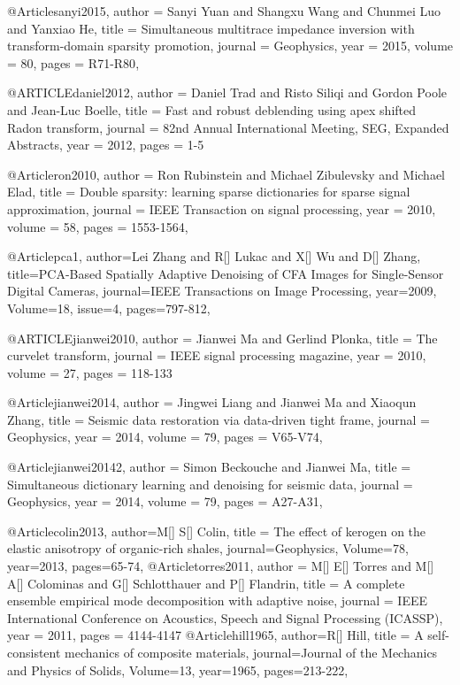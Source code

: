 {@Article{sanyi2015,
  author = 	 {Sanyi Yuan and Shangxu Wang and Chunmei Luo and Yanxiao He},
  title = 	 {Simultaneous multitrace impedance inversion with transform-domain sparsity promotion},
  journal = 	 {Geophysics},
  year = 	 2015,
  volume =	 80,
  pages =	 {R71-R80},
}

@ARTICLE{daniel2012,
  author = {Daniel Trad and Risto Siliqi and Gordon Poole and Jean-Luc Boelle},
  title = {Fast and robust deblending using apex shifted Radon transform},
  journal = {82nd Annual International Meeting, SEG, Expanded Abstracts},
  year = {2012},
  pages = {1-5}
}

@Article{ron2010,
  author = 	 {Ron Rubinstein and Michael Zibulevsky and Michael Elad},
  title = 	 {Double sparsity: learning sparse dictionaries for sparse signal approximation},
  journal = 	 {IEEE Transaction on signal processing},
  year = 	 2010,
  volume =	 58,
  pages =	 {1553-1564},
}

@Article{pca1,
  author={Lei Zhang and R[] Lukac and X[] Wu and D[] Zhang},
  title={PCA-Based Spatially Adaptive Denoising of {CFA} Images for Single-Sensor Digital Cameras},
  journal={IEEE Transactions on Image Processing},
  year=2009,
  Volume=18,
  issue=4,
  pages={797-812},
}

@ARTICLE{jianwei2010,
  author = {Jianwei Ma and Gerlind Plonka},
  title = {The curvelet transform},
  journal = {IEEE signal processing magazine},
  year = {2010},
  volume = {27},
  pages = {118-133}
}

@Article{jianwei2014,
  author = 	 {Jingwei Liang and Jianwei Ma and Xiaoqun Zhang},
  title = 	 {Seismic data restoration via data-driven tight frame},
  journal = 	 {Geophysics},
  year = 	 2014,
  volume =	 79,
  pages =	 {V65-V74},
}

@Article{jianwei20142,
  author = 	 {Simon Beckouche and Jianwei Ma},
  title = 	 {Simultaneous dictionary learning and denoising for seismic data},
  journal = 	 {Geophysics},
  year = 	 2014,
  volume =	 79,
  pages =	 {A27-A31},
}

@Article{colin2013,
  author={M[] S[] Colin},
  title = {The effect of kerogen on the elastic anisotropy of organic-rich shales},
  journal={Geophysics},
  Volume=78,
  year=2013,
  pages={65-74},
}
@Article{torres2011,
  author = 	 {M[] E[] Torres and M[] A[] Colominas and G[] Schlotthauer and P[] Flandrin},
  title = 	 {A complete ensemble empirical mode decomposition with adaptive noise},
  journal = 	 {IEEE International Conference on Acoustics, Speech and Signal Processing (ICASSP)},
  year = 	 2011,
  pages = 	 {4144-4147}
}
@Article{hill1965,
  author={R[] Hill},
  title = {A self-consistent mechanics of composite materials},
  journal={Journal of the Mechanics and Physics of Solids},
  Volume=13,
  year=1965,
  pages={213-222},
}

}
